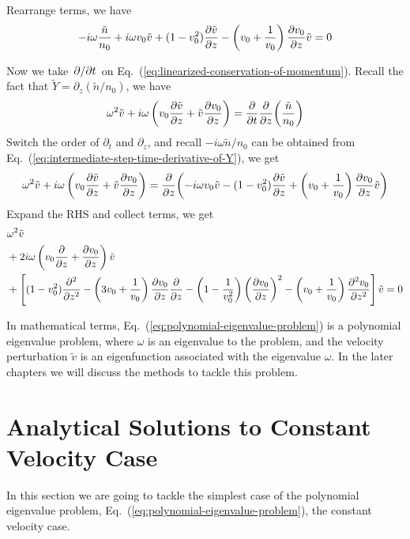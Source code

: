 Rearrange terms, we have
\begin{equation}
	-i\omega\frac{\tilde{n}}{n_0}
	+ i\omega v_0\tilde{v}
	+ (1-v_0^2)\pdv{\tilde{v}}{z}
	- \left(v_0+\frac{1}{v_0}\right)\pdv{v_0}{z}\tilde{v} = 0
	\label{eq:intermediate-step-time-derivative-of-Y}
\end{equation}

Now we take $\pdv*{t}$ on Eq.~(\ref{eq:linearized-conservation-of-momentum}). Recall the fact that $\tilde{Y} = \partial_z(\tilde{n}/n_0)$, we have
\[
	\omega^2\tilde{v} + i\omega\left(v_0\pdv{\tilde{v}}{z} + \tilde{v}\pdv{v_0}{z}\right)
	= \pdv{t}\pdv{z}(\frac{\tilde{n}}{n_0})
\]
Switch the order of $\partial_t$ and $\partial_z$, and recall $-i\omega \tilde{n}/n_0$ can be obtained from Eq.~(\ref{eq:intermediate-step-time-derivative-of-Y}), we get
\[
	\omega^2\tilde{v} + i\omega\left(v_0\pdv{\tilde{v}}{z} + \tilde{v}\pdv{v_0}{z}\right)
	= \pdv{z}(-i\omega v_0\tilde{v}
	- (1-v_0^2)\pdv{\tilde{v}}{z}
	+ \left(v_0+\frac{1}{v_0}\right)\pdv{v_0}{z}\tilde{v})
\]
Expand the RHS and collect terms, we get
\begin{equation} \label{eq:polynomial-eigenvalue-problem}
	\begin{aligned}
		 & \omega^2 \tilde{v}                                          \\
		 & +2i\omega\left(v_0\pdv{}{z} + \pdv{v_0}{z}\right) \tilde{v} \\
		 & +\left[ (1-v_0^2)\pdv[2]{}{z}
			-\left(3v_0 + \frac{1}{v_0}\right)\pdv{v_0}{z}\pdv{}{z}
			- \left(1-\frac{1}{v_0^2}\right)\left(\pdv{v_0}{z}\right)^2
			- \left(v_0+\frac{1}{v_0}\right)\pdv[2]{v_0}{z} \right]\tilde{v}
		= 0
	\end{aligned}
\end{equation}

In mathematical terms, Eq.~(\ref{eq:polynomial-eigenvalue-problem}) is a polynomial eigenvalue problem, where $\omega$ is an eigenvalue to the problem, and the velocity perturbation $\tilde{v}$ is an eigenfunction associated with the eigenvalue $\omega$. In the later chapters we will discuss the methods to tackle this problem.

\section{Analytical Solutions to Constant Velocity Case} \label{sec:analytical-solutions}
In this section we are going to tackle the simplest case of the polynomial eigenvalue problem, Eq.~(\ref{eq:polynomial-eigenvalue-problem}), the constant velocity case.


